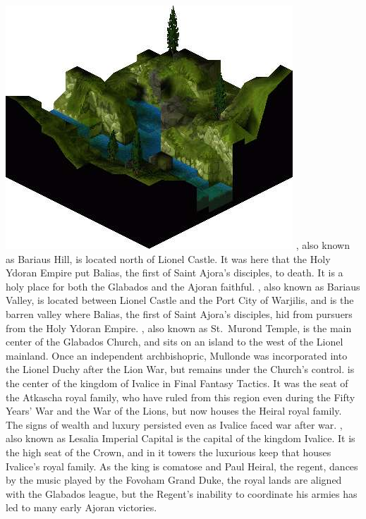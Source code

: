 \includegraphics[width=\columnwidth]{./art/worldbook/bariaus.jpg}
\vfill
%
, also known as Bariaus Hill, is located north of Lionel Castle. 
It was here that the Holy Ydoran Empire put Balias, the first of Saint Ajora’s disciples, to death. 
It is a holy place for both the Glabados and the Ajoran faithful.
, also known as Bariaus Valley, is located between Lionel Castle and the Port City of Warjilis, and is the barren valley where Balias, the first of Saint Ajora's disciples, hid from pursuers from the Holy Ydoran Empire.
, also known as St.~Murond Temple, is the main center of the Glabados Church, and sits on an island to the west of the Lionel mainland. 
Once an independent archbishopric, Mullonde was incorporated into the Lionel Duchy after the Lion War, but remains under the Church's control.
%
%
\clearpage
%
 is the center of the kingdom of Ivalice in Final Fantasy Tactics. 
It was the seat of the Atkascha royal family, who have ruled from this region even during the Fifty Years' War and the War of the Lions, but now houses the Heiral royal family. 
The signs of wealth and luxury persisted even as Ivalice faced war after war.
, also known as Lesalia Imperial Capital is the capital of the kingdom Ivalice. 
It is the high seat of the Crown, and in it towers the luxurious keep that houses Ivalice's royal family. 
As the king is comatose and Paul Heiral, the regent, dances by the music played by the Fovoham Grand Duke, the royal lands are aligned with the Glabados league, but the Regent's inability to coordinate his armies has led to many early Ajoran victories. 
